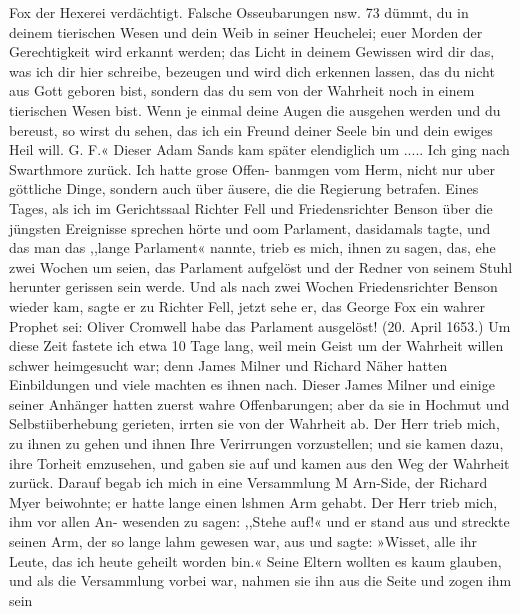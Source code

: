 Fox der Hexerei verdächtigt. Falsche Osseubarungen nsw. 73
dümmt, du in deinem tierischen Wesen und dein Weib in seiner
Heuchelei; euer Morden der Gerechtigkeit wird erkannt werden;
das Licht in deinem Gewissen wird dir das, was ich dir hier
schreibe, bezeugen und wird dich erkennen lassen, das du nicht
aus Gott geboren bist, sondern das du sem von der Wahrheit
noch in einem tierischen Wesen bist. Wenn je einmal deine Augen
die ausgehen werden und du bereust, so wirst du sehen, das ich
ein Freund deiner Seele bin und dein ewiges Heil will.
G. F.«
Dieser Adam Sands kam später elendiglich um .....
Ich ging nach Swarthmore zurück. Ich hatte grose Offen-
banmgen vom Herm, nicht nur uber göttliche Dinge, sondern
auch über äusere, die die Regierung betrafen. Eines Tages,
als ich im Gerichtssaal Richter Fell und Friedensrichter Benson
über die jüngsten Ereignisse sprechen hörte und oom Parlament,
dasidamals tagte, und das man das ,,lange Parlament« nannte,
trieb es mich, ihnen zu sagen, das, ehe zwei Wochen um seien,
das Parlament aufgelöst und der Redner von seinem Stuhl herunter
gerissen sein werde. Und als nach zwei Wochen Friedensrichter
Benson wieder kam, sagte er zu Richter Fell, jetzt sehe er, das
George Fox ein wahrer Prophet sei: Oliver Cromwell habe das
Parlament ausgelöst! (20. April 1653.)
Um diese Zeit fastete ich etwa 10 Tage lang, weil mein
Geist um der Wahrheit willen schwer heimgesucht war; denn
James Milner und Richard Näher hatten Einbildungen und viele
machten es ihnen nach. Dieser James Milner und einige seiner
Anhänger hatten zuerst wahre Offenbarungen; aber da sie in
Hochmut und Selbstiiberhebung gerieten, irrten sie von der
Wahrheit ab. Der Herr trieb mich, zu ihnen zu gehen und ihnen
Ihre Verirrungen vorzustellen; und sie kamen dazu, ihre Torheit
emzusehen, und gaben sie auf und kamen aus den Weg der
Wahrheit zurück. Darauf begab ich mich in eine Versammlung
M Arn-Side, der Richard Myer beiwohnte; er hatte lange einen
lshmen Arm gehabt. Der Herr trieb mich, ihm vor allen An-
wesenden zu sagen: ,,Stehe auf!« und er stand aus und streckte
seinen Arm, der so lange lahm gewesen war, aus und sagte:
»Wisset, alle ihr Leute, das ich heute geheilt worden bin.« Seine
Eltern wollten es kaum glauben, und als die Versammlung
vorbei war, nahmen sie ihn aus die Seite und zogen ihm sein


